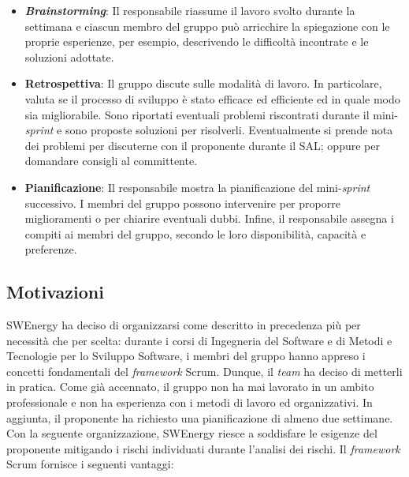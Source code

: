 \begin{itemize}
	\item \textbf{\textit{Brainstorming}}: Il responsabile riassume il lavoro
	      svolto durante la settimana e ciascun membro del gruppo può arricchire
	      la spiegazione con le proprie esperienze, per esempio, descrivendo le
	      difficoltà incontrate e le soluzioni adottate.

	\item \textbf{Retrospettiva}: Il gruppo discute sulle modalità di
	      lavoro. In particolare, valuta se il processo di sviluppo è stato
	      efficace ed efficiente ed in quale modo sia migliorabile. Sono
	      riportati eventuali problemi riscontrati durante il
	      mini-\textit{sprint} e sono proposte soluzioni per risolverli.
	      Eventualmente si prende nota dei problemi per discuterne con il
	      proponente durante il SAL; oppure per domandare consigli al
	      committente.

	\item \textbf{Pianificazione}: Il responsabile mostra la pianificazione del
	      mini-\textit{sprint} successivo. I membri del gruppo possono
	      intervenire per proporre miglioramenti o per chiarire eventuali dubbi.
	      Infine, il responsabile assegna i compiti ai membri del gruppo,
	      secondo le loro disponibilità, capacità e preferenze.
\end{itemize}

\subsection{Motivazioni}

SWEnergy ha deciso di organizzarsi come descritto in precedenza più per
necessità che per scelta: durante i corsi di Ingegneria del Software e di Metodi
e Tecnologie per lo Sviluppo Software, i membri del gruppo hanno appreso i
concetti fondamentali del \textit{framework} Scrum. Dunque, il \textit{team} ha
deciso di metterli in pratica. Come già accennato, il gruppo non ha mai lavorato
in un ambito professionale e non ha esperienza con i metodi di lavoro ed
organizzativi. In aggiunta, il proponente ha richiesto una pianificazione di
almeno due settimane.
Con la seguente organizzazione, SWEnergy riesce a soddisfare le
esigenze del proponente mitigando i rischi individuati durante l'analisi dei
rischi. Il \textit{framework} Scrum fornisce i seguenti vantaggi:

